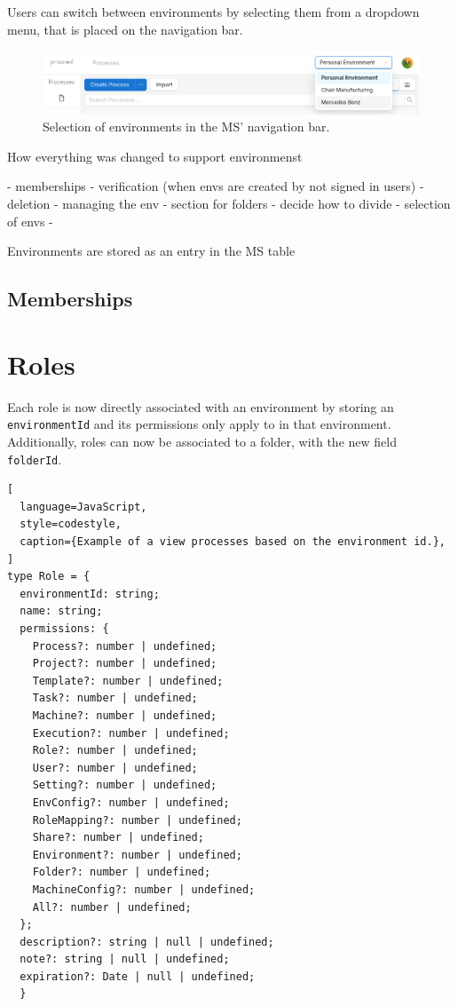 Users can switch between environments by selecting them from a dropdown menu, that is
placed on the navigation bar.


\begin{figure}[H]
	\centering
	\includegraphics[scale=0.3]{images/select-environment.png}
	\caption{Selection of environments in the MS' navigation bar.}
	\vspace{-1em} %
\end{figure}

How everything was changed to support environmenst

- memberships
- verification (when envs are created by not signed in users)
- deletion - managing the env
- section for folders
- decide how to divide
- selection of envs
-

Environments are stored as an entry in the MS table

\subsection{Memberships}

\section{Roles}

Each role is now directly associated with an environment by storing an
\lstinline{environmentId} and its permissions only apply to in that environment.
Additionally, roles can now be associated to a folder, with the new field \lstinline{folderId}.



\begin{lstlisting}[
  language=JavaScript,
  style=codestyle,
  caption={Example of a view processes based on the environment id.},
]
type Role = {
  environmentId: string;
  name: string;
  permissions: {
    Process?: number | undefined;
    Project?: number | undefined;
    Template?: number | undefined;
    Task?: number | undefined;
    Machine?: number | undefined;
    Execution?: number | undefined;
    Role?: number | undefined;
    User?: number | undefined;
    Setting?: number | undefined;
    EnvConfig?: number | undefined;
    RoleMapping?: number | undefined;
    Share?: number | undefined;
    Environment?: number | undefined;
    Folder?: number | undefined;
    MachineConfig?: number | undefined;
    All?: number | undefined;
  };
  description?: string | null | undefined;
  note?: string | null | undefined;
  expiration?: Date | null | undefined;
  }
\end{lstlisting}

